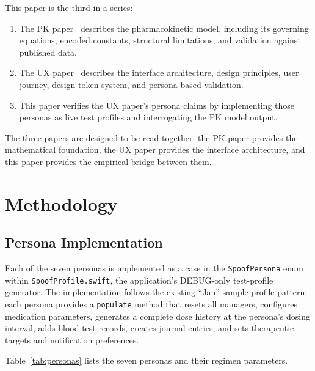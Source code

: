 \documentclass[11pt,a4paper]{article}
\newcommand{\code}[1]{\texttt{\small #1}}
\begin{document}
This paper is the third in a series:

\begin{enumerate}[nosep,leftmargin=1.4em]
\item The PK paper~\cite{xtpk} describes the pharmacokinetic model,
  including its governing equations, encoded constants, structural
  limitations, and validation against published data.
\item The UX paper~\cite{xtux} describes the interface architecture, design
  principles, user journey, design-token system, and persona-based
  validation.
\item This paper verifies the UX paper's persona claims by implementing
  those personas as live test profiles and interrogating the PK model
  output.
\end{enumerate}

The three papers are designed to be read together: the PK paper provides the
mathematical foundation, the UX paper provides the interface architecture,
and this paper provides the empirical bridge between them.

\section{Methodology}
\label{sec:method}

\subsection{Persona Implementation}

Each of the seven personas is implemented as a case in the
\code{SpoofPersona} enum within \code{SpoofProfile.swift}, the application's
DEBUG-only test-profile generator. The implementation follows the existing
``Jan'' sample profile pattern: each persona provides a \code{populate}
method that resets all managers, configures medication parameters, generates
a complete dose history at the persona's dosing interval, adds blood test
records, creates journal entries, and sets therapeutic targets and
notification preferences.

Table~\ref{tab:personas} lists the seven personas and their regimen
parameters.
\end{document}
